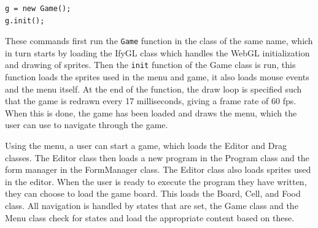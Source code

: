 \begin{lstlisting}
g = new Game();
g.init();
\end{lstlisting}

These commands first run the \texttt{Game} function in the class of the same name, which in turn starts by loading the IfyGL class which handles the WebGL initialization and drawing of sprites. Then the \texttt{init} function of the Game class is run, this function loads the sprites used in the menu and game, it also loads mouse events and the menu itself. At the end of the function, the draw loop is specified such that the game is redrawn every 17 milliseconds, giving a frame rate of 60 fps.
When this is done, the game has been loaded and draws the menu, which the user can use to navigate through the game.\newline

Using the menu, a user can start a game, which loads the Editor and Drag classes. The Editor class then loads a new program in the Program class and the form manager in the FormManager class. The Editor class also loads sprites used in the editor. When the user is ready to execute the program they have written, they can choose to load the game board. This loads the Board, Cell, and Food class. All navigation is handled by states that are set, the Game class and the Menu class check for states and load the appropriate content based on these.